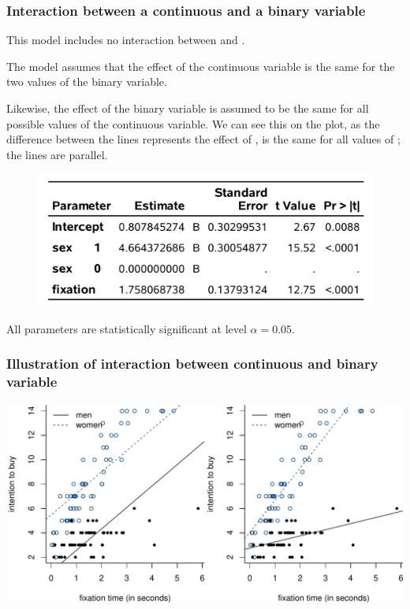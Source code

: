 \documentclass{beamer}
\begin{document}
 \begin{frame}[fragile]
\frametitle{Interaction between a continuous and a binary variable}
\bi
\item This model includes no interaction between  and .
\item The model assumes that the
effect of the continuous variable  is \alert{the same} for the two values of the binary variable. 
\item Likewise, the effect of the binary variable is assumed to be the same for all possible values of the continuous variable. We can see this on the plot, as the difference between the lines represents the effect of , is the same for all values of ; the lines are \alert{parallel}. 
\ei
\begin{figure}
 \centering
 \includegraphics[width=0.65\linewidth]{img/c2/slides3-e18}
\end{figure}
{ \footnotesize All parameters are statistically significant at level $\alpha =0.05$.}
\end{frame}


 \begin{frame}[fragile]
  \frametitle{Illustration of interaction between continuous and binary variable}
  \includegraphics[width =\textwidth]{img/c2/03-linreg-interaction_cont.pdf}
 \end{frame}
\end{document}

